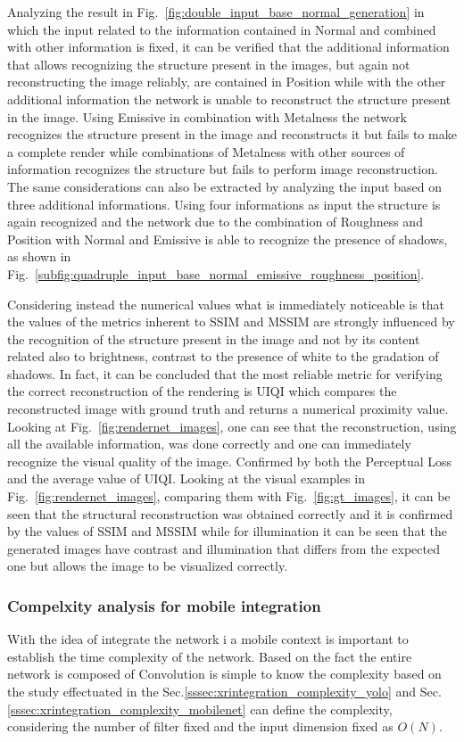 Analyzing the result in Fig.~\ref{fig:double_input_base_normal_generation} in which the input related to the information contained in Normal and combined with other information is fixed, it can be verified that the additional information that allows recognizing the structure present in the images, but again not reconstructing the image reliably, are contained in Position while with the other additional information the network is unable to reconstruct the structure present in the image. 
Using Emissive in combination with Metalness the network recognizes the structure present in the image and reconstructs it but fails to make a complete render while combinations of Metalness with other sources of information recognizes the structure but fails to perform image reconstruction.
The same considerations can also be extracted by analyzing the input based on three additional informations.
Using four informations as input the structure is again recognized and the network due to the combination of Roughness and Position with Normal and Emissive is able to recognize the presence of shadows, as shown in Fig.~\ref{subfig:quadruple_input_base_normal_emissive_roughness_position}.

Considering instead the numerical values what is immediately noticeable is that the values of the metrics inherent to SSIM and MSSIM are strongly influenced by the recognition of the structure present in the image and not by its content related also to brightness, contrast to the presence of white to the gradation of shadows. In fact, it can be concluded that the most reliable metric for verifying the correct reconstruction of the rendering is UIQI which compares the reconstructed image with ground truth and returns a numerical proximity value. Looking at Fig.~\ref{fig:rendernet_images}, one can see that the reconstruction, using all the available information, was done correctly and one can immediately recognize the visual quality of the image. Confirmed by both the Perceptual Loss and the average value of UIQI. Looking at the visual examples in Fig.~\ref{fig:rendernet_images}, comparing them with Fig.~\ref{fig:gt_images}, it can be seen that the structural reconstruction was obtained correctly and it is confirmed by the values of SSIM and MSSIM while for illumination it can be seen that the generated images have contrast and illumination that differs from the expected one but allows the image to be visualized correctly.

\subsubsection{Compelxity analysis for mobile integration}
With the idea of integrate the network i a mobile context is important to establish the time complexity of the network. Based on the fact the entire network is composed of Convolution is simple to know the complexity based on the study effectuated in the Sec.\ref{sssec:xrintegration_complexity_yolo} and Sec.\ref{sssec:xrintegration_complexity_mobilenet} can define the complexity, considering the number of filter fixed and the input dimension fixed as $O(N)$.

